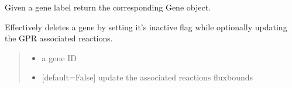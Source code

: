 \documentclass[letterpaper,12pt,english]{sphinxmanual}
\begin{document}
\begin{fulllineitems}
\begin{fulllineitems}
\begin{quote}
\begin{description}
\end{description}\end{quote}

\end{fulllineitems}


\begin{fulllineitems}
\label{\detokenize{api/core:cbmpy.CBModel.Model.getGeneByLabel}}
\pysigstartsignatures
\pysiglinewithargsret
{}
{}
{}
\pysigstopsignatures
\sphinxAtStartPar
Given a gene label return the corresponding Gene object.
\begin{quote}\begin{description}
\sphinxAtStartPar
{}

\end{description}\end{quote}

\end{fulllineitems}


\begin{fulllineitems}
\label{\detokenize{api/core:cbmpy.CBModel.Model.setGeneInactive}}
\pysigstartsignatures
\pysiglinewithargsret
{}
{\sphinxparamcomma {}\sphinxparamcomma {}\sphinxparamcomma {}}
{}
\pysigstopsignatures
\sphinxAtStartPar
Effectively deletes a gene by setting it’s inactive flag while optionally updating the GPR associated reactions.
\begin{quote}\begin{description}
\begin{itemize}
\item {} 
\sphinxAtStartPar
{} \textendash{} a gene ID

\item {} 
\sphinxAtStartPar
{} \textendash{} {[}default=False{]} update the associated reactions fluxbounds


\end{itemize}
\end{description}
\end{quote}
\end{fulllineitems}
\end{fulllineitems}
\end{document}
